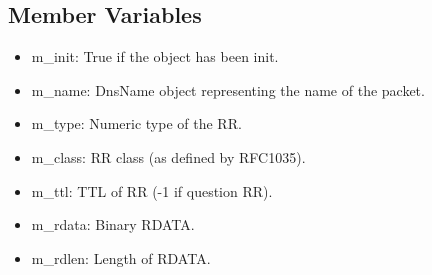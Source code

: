 \subsection{Member Variables}

\begin{itemize}
\item m\_init: True if the object has been init.
\item m\_name: DnsName object representing the name of the packet.
\item m\_type: Numeric type of the RR.
\item m\_class: RR class (as defined by RFC1035).
\item m\_ttl: TTL of RR (-1 if question RR).
\item m\_rdata: Binary RDATA.
\item m\_rdlen: Length of RDATA.
\end{itemize}
